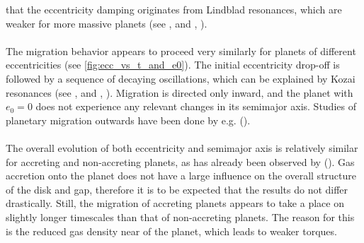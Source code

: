       that the eccentricity damping originates from 
      Lindblad resonances, which are weaker for more massive planets 
      (see \citeauthor{Papaloizou_2001}, \citeyear{Papaloizou_2001} 
      and \citeauthor{Kley_2006}, \citeyear{Kley_2006}). \\
      \\
      The migration behavior appears to proceed very similarly for planets of 
      different eccentricities (see \autoref{fig:ecc_vs_t_and_e0}). The
      initial eccentricity drop-off is followed by a sequence of 
      decaying oscillations, which can be explained by Kozai resonances
      (see \citeauthor{Kozai_1962}, \citeyear{Kozai_1962} and 
      \citeauthor{Bitsch_2013}, \citeyear{Bitsch_2013}). Migration is directed 
      only inward, and the planet with $e_0=0$ does not experience any 
      relevant changes in its semimajor axis. Studies of planetary migration 
      outwards have been done by e.g. \citeauthor{Bitsch_2013_migration} 
      (\citeyear{Bitsch_2013_migration}). \\ 
      \\
      The overall evolution of both eccentricity and semimajor axis is 
      relatively similar for accreting and non-accreting planets, as has 
      already been observed by \citeauthor{Kley_2015} 
      (\citeyear{Kley_2015}). Gas accretion onto the planet does not have 
      a large influence on the overall structure of the disk and gap,
      therefore it is to be expected that the results do not differ 
      drastically. Still, the migration of accreting planets appears to take a 
      place on slightly longer timescales than that of non-accreting planets.
      The reason for this is the reduced gas density near of the planet, which 
      leads to weaker torques.
